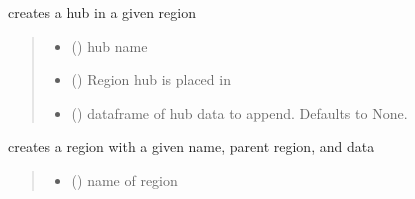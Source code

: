 \documentclass[letterpaper,10pt,english]{sphinxmanual}
\begin{document}
\begin{fulllineitems}
\begin{fulllineitems}
\label{\detokenize{src.models.hydrogen.network.grid:src.models.hydrogen.network.grid.Grid.create_hub}}
\pysigstartsignatures
\pysiglinewithargsret
{}
{\sphinxparamcomma {}\sphinxparamcomma {}}
{}
\pysigstopsignatures
\sphinxAtStartPar
creates a hub in a given region
\begin{quote}\begin{description}
\begin{itemize}
\item {} 
\sphinxAtStartPar
{} () \textendash{} hub name

\item {} 
\sphinxAtStartPar
{} ({\hyperref[\detokenize{src.models.hydrogen.network.region:src.models.hydrogen.network.region.Region}]{}}) \textendash{} Region hub is placed in

\item {} 
\sphinxAtStartPar
{} (\sphinxstyleliteralemphasis{\sphinxupquote{, }}) \textendash{} dataframe of hub data to append. Defaults to None.

\end{itemize}

\end{description}\end{quote}

\end{fulllineitems}


\begin{fulllineitems}
\label{\detokenize{src.models.hydrogen.network.grid:src.models.hydrogen.network.grid.Grid.create_region}}
\pysigstartsignatures
\pysiglinewithargsret
{}
{\sphinxparamcomma {}\sphinxparamcomma {}}
{}
\pysigstopsignatures
\sphinxAtStartPar
creates a region with a given name, parent region, and data
\begin{quote}\begin{description}
\begin{itemize}
\item {} 
\sphinxAtStartPar
{} () \textendash{} name of region


\end{itemize}
\end{description}
\end{quote}
\end{fulllineitems}
\end{fulllineitems}
\end{document}
